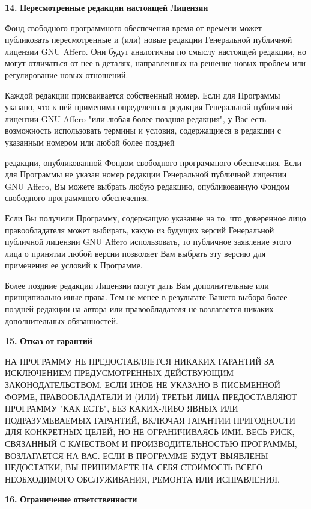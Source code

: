 {\bfseries{14.}} {\bfseries{Пересмотренные}} {\bfseries{редакции}} {\bfseries{настоящей}} {\bfseries{Лицензии}}

Фонд свободного программного обеспечения время от времени может публиковать пересмотренные и (или) новые редакции Генеральной публичной лицензии GNU Affero. Они будут аналогичны по смыслу настоящей редакции, но могут отличаться от нее в деталях, направленных на решение новых проблем или регулирование новых отношений.

Каждой редакции присваивается собственный номер. Если для Программы указано, что к ней применима определенная редакция Генеральной публичной лицензии GNU Affero "{}или любая более поздняя редакция"{}, у Вас есть возможность использовать термины и условия, содержащиеся в редакции с указанным номером или любой более поздней

редакции, опубликованной Фондом свободного программного обеспечения. Если для Программы не указан номер редакции Генеральной публичной лицензии GNU Affero, Вы можете выбрать любую редакцию, опубликованную Фондом свободного программного обеспечения.

Если Вы получили Программу, содержащую указание на то, что доверенное лицо правообладателя может выбирать, какую из будущих версий Генеральной публичной лицензии GNU Affero использовать, то публичное заявление этого лица о принятии любой версии позволяет Вам выбрать эту версию для применения ее условий к Программе.

Более поздние редакции Лицензии могут дать Вам дополнительные или принципиально иные права. Тем не менее в результате Вашего выбора более поздней редакции на автора или правообладателя не возлагается никаких дополнительных обязанностей.

{\bfseries{15.}} {\bfseries{Отказ}} {\bfseries{от}} {\bfseries{гарантий}}

НА ПРОГРАММУ НЕ ПРЕДОСТАВЛЯЕТСЯ НИКАКИХ ГАРАНТИЙ ЗА ИСКЛЮЧЕНИЕМ ПРЕДУСМОТРЕННЫХ ДЕЙСТВУЮЩИМ ЗАКОНОДАТЕЛЬСТВОМ. ЕСЛИ ИНОЕ НЕ УКАЗАНО В ПИСЬМЕННОЙ ФОРМЕ, ПРАВООБЛАДАТЕЛИ И (ИЛИ) ТРЕТЬИ ЛИЦА ПРЕДОСТАВЛЯЮТ ПРОГРАММУ "{}КАК ЕСТЬ"{}, БЕЗ КАКИХ-\/ЛИБО ЯВНЫХ ИЛИ ПОДРАЗУМЕВАЕМЫХ ГАРАНТИЙ, ВКЛЮЧАЯ ГАРАНТИИ ПРИГОДНОСТИ ДЛЯ КОНКРЕТНЫХ ЦЕЛЕЙ, НО НЕ ОГРАНИЧИВАЯСЬ ИМИ. ВЕСЬ РИСК, СВЯЗАННЫЙ С КАЧЕСТВОМ И ПРОИЗВОДИТЕЛЬНОСТЬЮ ПРОГРАММЫ, ВОЗЛАГАЕТСЯ НА ВАС. ЕСЛИ В ПРОГРАММЕ БУДУТ ВЫЯВЛЕНЫ НЕДОСТАТКИ, ВЫ ПРИНИМАЕТЕ НА СЕБЯ СТОИМОСТЬ ВСЕГО НЕОБХОДИМОГО ОБСЛУЖИВАНИЯ, РЕМОНТА ИЛИ ИСПРАВЛЕНИЯ.

{\bfseries{16.}} {\bfseries{Ограничение}} {\bfseries{ответственности}}

